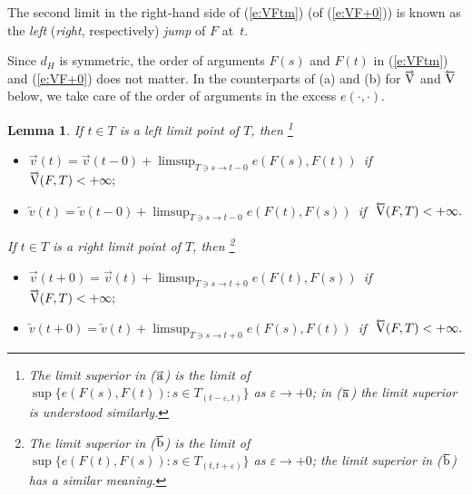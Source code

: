 \documentclass[preprint,12pt]{elsarticle}
\newtheorem{lem}{Lemma}
\newcommand{\eq}[1]{\mbox{\rm(\ref{#1})}}
\newcommand{\vep}{\varepsilon}
\newcommand{\riV}{{\scriptstyle\overrightarrow{\mbox{\rm V}}}}
\newcommand{\leV}{{\scriptstyle\overleftarrow{\mbox{\rm V}}}}
\newcommand{\ori}[1]{{\scriptscriptstyle\overrightarrow{\mbox{$#1$}}}}
\newcommand{\ole}[1]{{\scriptscriptstyle\overleftarrow{\mbox{$#1$}}}}
\begin{document}
The second limit in the right-hand side of \eq{e:VFtm} (of \eq{e:VF+0}) is known as
the \emph{left\/} (\emph{right\/}, respectively) \emph{jump\/} of $F$ at~$t$.

Since $d_H$ is symmetric, the order of arguments $F(s)$ and $F(t)$ in \eq{e:VFtm}
and \eq{e:VF+0} does not matter. In the counterparts of (a) and (b) for $\riV$ and
$\leV$ below, we take care of the order of arguments in the excess $e(\cdot,\cdot)$.

\begin{lem} \label{l:jumps}
If $t\in T$ is a left limit point of $T$, then%
\footnote{The limit superior in ($\ori{\mbox{\rm a}}$) is the limit of
$\sup\{e(F(s),F(t)):s\in T_{(t-\vep,t)}\}$ as $\vep\to+0$;
in ($\ole{\mbox{\rm a}}$) the limit superior is understood similarly.}
  \begin{itemize}
\item[${\rm(\ori{\mbox{\rm a}})}$] $\ori{v}(t)=\ori{v}(t-0)+\displaystyle
  \limsup_{T\ni s\to t-0}e(F(s),F(t))$ \,if \,\,$\riV(F,T)<+\infty;$
\item[${\rm(\ole{\mbox{\rm a}})}$] $\ole{v}(t)=\ole{v}(t-0)+\displaystyle
  \limsup_{T\ni s\to t-0}e(F(t),F(s))$ \,if \,\,$\leV(F,T)<+\infty.$
  \end{itemize}

If $t\in T$ is a right limit point of $T$, then%
\footnote{The limit superior in ($\ori{\mbox{\rm b}}$) is the limit of
$\sup\{e(F(t),F(s)):s\in T_{(t,t+\vep)}\}$ as $\vep\to+0$;
the limit superior in ($\ole{\mbox{\rm b}}$) has a similar meaning.}
  \begin{itemize}
\item[${\rm(\ori{\mbox{\rm b}})}$] $\ori{v}(t+0)=\ori{v}(t)+\displaystyle
  \limsup_{T\ni s\to t+0}e(F(t),F(s))$ \,if \,\,$\riV(F,T)<+\infty;$
\item[${\rm(\ole{\mbox{\rm b}})}$] $\ole{v}(t+0)=\ole{v}(t)+\displaystyle
  \limsup_{T\ni s\to t+0}e(F(s),F(t))$ \,if \,\,$\leV(F,T)<+\infty.$
  \end{itemize}
\end{lem}
\end{document}
